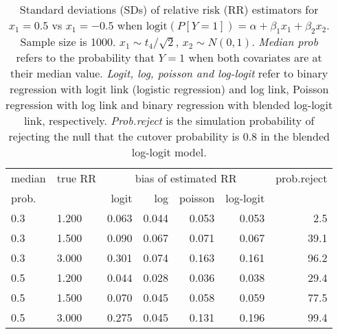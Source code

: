 \documentclass[12pt,a4paper]{article}
\begin{document}
\begin{table}[H] 
\small\sf\centering 
\caption{Standard deviations (SDs) of relative risk (RR) estimators for $x_1=0.5$ vs $x_1=-0.5$ when $\mbox{logit}(P[Y=1])=\alpha+\beta_1 x_1 + \beta_2 x_2$. Sample size is 1000. $x_1 \sim $$t_4/\sqrt{2}$, $x_2 \sim N(0,1)$. {\it Median prob} refers to the probability that $Y=1$ when both covariates are at their median value. {\it Logit, log, poisson and log-logit} refer to binary regression with logit link (logistic regression) and log link, Poisson regression with log link and binary regression with blended log-logit link, respectively. {\it Prob.reject} is the simulation probability of rejecting the null that the cutover probability is $0.8$ in the blended log-logit model.} 
\begin{tabular}{llrrrrr} 
\toprule 
median & true RR & \multicolumn{4}{c}{bias of estimated RR} & prob.reject \\ 
prob. & & logit & log & poisson & log-logit  & \\ \midrule 
0.3 & 1.200 & 0.063 & 0.044 & 0.053 & 0.053 &  2.5 \\  
0.3 & 1.500 & 0.090 & 0.067 & 0.071 & 0.067 & 39.1 \\  
0.3 & 3.000 & 0.301 & 0.074 & 0.163 & 0.161 & 96.2 \\  
0.5 & 1.200 & 0.044 & 0.028 & 0.036 & 0.038 & 29.4 \\  
0.5 & 1.500 & 0.070 & 0.045 & 0.058 & 0.059 & 77.5 \\  
0.5 & 3.000 & 0.275 & 0.045 & 0.131 & 0.196 & 99.4 \\  
\bottomrule 
\end{tabular} 
\end{table} 
\end{document}
